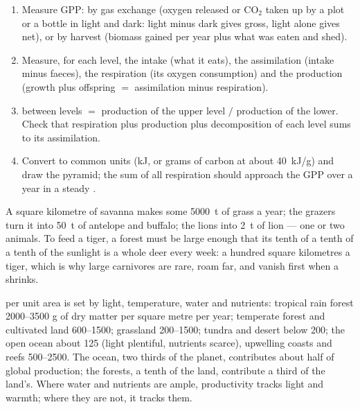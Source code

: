 \begin{method}\label{met:b1:ecosystem-organization:budget}
\begin{enumerate}
  \item Measure GPP: by gas exchange (oxygen released or
        $\mathrm{CO_2}$ taken up by a plot or a bottle in light and
        dark: light minus dark gives gross, light alone gives net), or
        by harvest (biomass gained per year plus what was eaten and
        shed).
  \item Measure, for each  level, the intake (what it eats),
        the assimilation (intake minus faeces), the respiration (its
        oxygen consumption) and the production (growth plus offspring
        $=$ assimilation minus respiration).
  \item {} between levels $=$ production of the upper
        level $/$ production of the lower. Check that respiration plus
        production plus decomposition of each level sums to its
        assimilation.
  \item Convert to common units (\unit{kJ}, or grams of carbon at
        about \qty{40}{kJ/g}) and draw the pyramid; the sum of all
        respiration should approach the GPP over a year in a steady
        .
\end{enumerate}
\end{method}

\begin{example}\label{ex:b1:ecosystem-organization:top}
A square kilometre of savanna makes some \qty{5000}{t} of grass a
year; the grazers turn it into \qty{50}{t} of antelope and buffalo;
the lions into \qty{2}{t} of lion --- one or two animals. To feed a
tiger, a forest must be large enough that its tenth of a tenth of a
tenth of the sunlight is a whole deer every week: a hundred square
kilometres a tiger, which is why large carnivores are rare, roam far,
and vanish first when a  shrinks.
\end{example}

\begin{proposition}\label{prop:b1:ecosystem-organization:biomes}
 per unit area is set by light, temperature,
water and nutrients: tropical rain forest \qtyrange{2000}{3500}{} g of
dry matter per square metre per year; temperate forest and cultivated
land \qtyrange{600}{1500}{}; grassland \qtyrange{200}{1500}{}; tundra
and desert below \qty{200}{}; the open ocean about \qty{125}{} (light
plentiful, nutrients scarce), upwelling coasts and reefs \qtyrange{500}{2500}{}.
The ocean, two thirds of the planet, contributes about half of global
production; the forests, a tenth of the land, contribute a third of
the land's. Where water and nutrients are ample, productivity tracks
light and warmth; where they are not, it tracks them.
\end{proposition}

